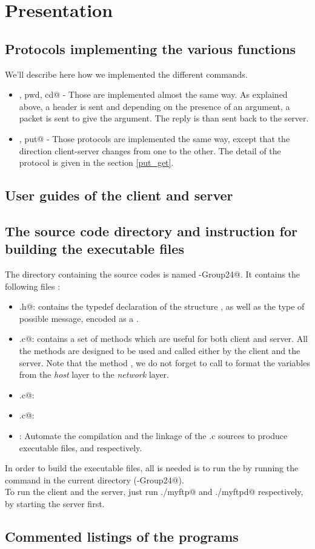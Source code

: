 \documentclass{article}
\begin{document}
\section{Presentation}
\subsection{Protocols implementing the various functions}
We'll describe here how we implemented the different commands.
\begin{itemize}
    \item \verb@ls, pwd, cd@ - Those are implemented almost the same way. As explained above, a header is sent and depending on the presence of an argument, a packet is sent to give the argument. The reply is than sent back to the server.
    \item \verb@get, put@ - Those protocols are implemented the same way, except that the direction client-server changes from one to the other. The detail of the protocol is given in the section \ref{put_get}.
\end{itemize}
\subsection{User guides of the client and server}
\subsection{The source code directory and instruction for building the executable files}
The directory containing the source codes is named -Group24@.  It contains the following files : 
\begin{itemize}
\item \verb@header.h@: contains the typedef declaration of the structure \verb@msgHeader@, as well as the type of possible message, encoded as a \verb@int@.
\item \verb@utils.c@: contains a set of methods which are useful for both client and server. All the methods are designed to be used and called either by the client and the server. Note that the method \verb@sendType@, we do not forget to call \verb@htonl@ to format the \verb@int@ variables from the \textit{host} layer to the \textit{network} layer.
\item \verb@myftp.c@:
\item \verb@myftpd.c@:
\item \verb@Makefile@: Automate the compilation and the linkage of the .c sources to produce executable files, \verb@myftp@ and \verb@myftpd@ respectively.
\end{itemize}
In order to build the executable files, all is needed is to run the \verb@Makefile@ by running the \verb@make@ command in the current directory (-Group24@).\\

To run the client and the server, just run \verb@./myftp@ and \verb@./myftpd@ respectively, by starting the server first.
\subsection{Commented listings of the programs}
\end{document}
